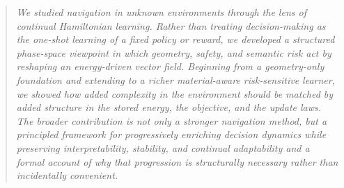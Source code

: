 \begin{quote}\itshape
We studied navigation in unknown environments through the
lens of continual Hamiltonian learning.
Rather than treating decision-making as the one-shot learning of a
fixed policy or reward, we developed a structured phase-space
viewpoint in which geometry, safety, and semantic risk act by
reshaping an energy-driven vector field.
Beginning from a geometry-only foundation and extending to a richer
material-aware risk-sensitive learner, we showed how added
complexity in the environment should be matched by added structure
in the stored energy, the objective, and the update laws.
The broader contribution is not only a stronger navigation method,
but a principled framework for progressively enriching decision
dynamics while preserving interpretability, stability, and
continual adaptability and a formal account of why that progression
is structurally necessary rather than incidentally convenient.
\end{quote}